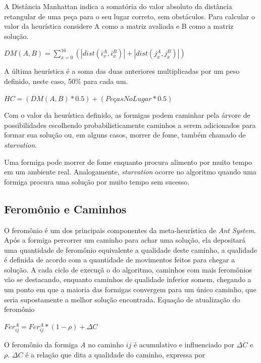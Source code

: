\documentclass[12pt]{article}
\begin{document}
A Distância Manhattan indica a somatória do valor absoluto da distância retangular de uma peça para o seu lugar correto, sem obstáculos. Para calcular o valor da heurística considere A como a matriz avaliada e B como a matriz solução.

{\centering
    $DM(A,B) = \sum_{x = 0}^{16} \left (\left |dist\left (i_{x}^{A},i_{x}^{B}  \right )  \right | + \left |dist\left (j_{x}^{A},j_{x}^{B}  \right )  \right |  \right )$\par
}

A última heurística é a soma das duas anteriores multiplicadas por um peso definido, neste caso, 50\% para cada um.

{\centering
    $HC = \left (DM(A,B) * 0.5  \right ) + \left (PeçasNoLugar * 0.5  \right )$\par
}

Com o valor da heurística definido, as formigas podem caminhar pela árvore de possibilidades escolhendo probabilisticamente caminhos a serem adicionados para formar sua solução ou, em alguns casos, morrer de fome, também chamado de \textit{starvation}.

Uma formiga pode morrer de fome enquanto procura alimento por muito tempo em um ambiente real. Analogamente, \textit{starvation} ocorre no algoritmo quando uma formiga procura uma solução por muito tempo sem sucesso.


\subsection{Feromônio e Caminhos}\label{sec:feromonioecaminho}
O feromônio é um dos principais componentes da meta-heurística de \textit{Ant System}. Após a formiga percorrer um caminho para achar uma solução, ela depositará uma quantidade de feromônio equivalente a qualidade deste caminho, a qualidade é definida de acordo com a quantidade de movimentos feitos para chegar a solução. A cada ciclo de execuçã    o do algoritmo, caminhos com mais feromônios vão se destacando, enquanto caminhos de qualidade inferior somem, chegando a um ponto em que a maioria das formigas convergem para um único caminho, que seria supostamente a melhor solução encontrada. Equação de atualização do feromônio

{\centering
    $Fer^{A}_{ij} = Fer^{A}_{ij} * (1 - \rho) + \Delta C$\par
}

O feromônio da formiga $A$ no caminho $ij$ é acumulativo e influenciado por $\Delta C$ e $\rho$.
$\Delta C$ é a relação que dita a qualidade do caminho, expressa por 
\end{document}
